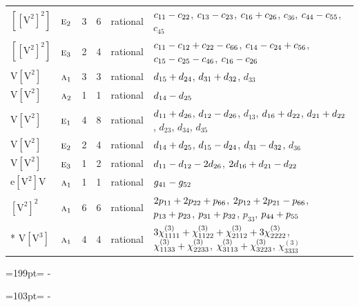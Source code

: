 \documentclass[10pt,a4paper]{article}
\newcommand{\needspace}[1]{\par\penalty-100\begingroup\dimen0=#1\relax\dimen2=\pagegoal
  \advance\dimen2-\pagetotal\ifdim\dimen0>\dimen2\relax\ifdim\dimen2>0pt\vfil\break\fi\fi
  \endgroup}
\numberwithin{equation}{section}
\newcommand{\irr}[1]{\text{\normalfont\scshape #1}}
\newcommand{\jahn}[1]{\mathrm{#1}}
\newlength{\fillwidth}\newlength{\cellwidth}\newlength{\colwidth}
\newcommand{\signbreak}{\penalty100\relax}
\begin{document}
{\begin{longtable}{@{}llrrl>{\RaggedRight\arraybackslash}p{\fillwidth}@{}}
$\jahn{[[V^{2}]^{2}]}$ & $\irr{e}_{2}$ & 3 & 6 & rational & $c_{11} -\signbreak c_{22}$, $c_{13} -\signbreak c_{23}$, $c_{16} +\signbreak c_{26}$, $c_{36}$, $c_{44} -\signbreak c_{55}$, $c_{45}$\\
$\jahn{[[V^{2}]^{2}]}$ & $\irr{e}_{3}$ & 2 & 4 & rational & $c_{11} -\signbreak c_{12} +\signbreak c_{22} -\signbreak c_{66}$, $c_{14} -\signbreak c_{24} +\signbreak c_{56}$, $c_{15} -\signbreak c_{25} -\signbreak c_{46}$, $c_{16} -\signbreak c_{26}$\\
$\jahn{V[V^{2}]}$ & $\irr{a}_{1}$ & 3 & 3 & rational & $d_{15} +\signbreak d_{24}$, $d_{31} +\signbreak d_{32}$, $d_{33}$\\
$\jahn{V[V^{2}]}$ & $\irr{a}_{2}$ & 1 & 1 & rational & $d_{14} -\signbreak d_{25}$\\
$\jahn{V[V^{2}]}$ & $\irr{e}_{1}$ & 4 & 8 & rational & $d_{11} +\signbreak d_{26}$, $d_{12} -\signbreak d_{26}$, $d_{13}$, $d_{16} +\signbreak d_{22}$, $d_{21} +\signbreak d_{22}$, $d_{23}$, $d_{34}$, $d_{35}$\\
$\jahn{V[V^{2}]}$ & $\irr{e}_{2}$ & 2 & 4 & rational & $d_{14} +\signbreak d_{25}$, $d_{15} -\signbreak d_{24}$, $d_{31} -\signbreak d_{32}$, $d_{36}$\\
$\jahn{V[V^{2}]}$ & $\irr{e}_{3}$ & 1 & 2 & rational & $d_{11} -\signbreak d_{12} -\signbreak 2d_{26}$, $2d_{16} +\signbreak d_{21} -\signbreak d_{22}$\\
$\jahn{e[V^{2}]V}$ & $\irr{a}_{1}$ & 1 & 1 & rational & $\mathnormal{g}_{41} -\signbreak \mathnormal{g}_{52}$\\
$\jahn{[V^{2}]^{2}}$ & $\irr{a}_{1}$ & 6 & 6 & rational & $2p_{11} +\signbreak 2p_{22} +\signbreak p_{66}$, $2p_{12} +\signbreak 2p_{21} -\signbreak p_{66}$, $p_{13} +\signbreak p_{23}$, $p_{31} +\signbreak p_{32}$, $p_{33}$, $p_{44} +\signbreak p_{55}$\\*
$\jahn{V[V^{3}]}$ & $\irr{a}_{1}$ & 4 & 4 & rational & $3\chi^{(3)}_{1111} +\signbreak \chi^{(3)}_{1122} +\signbreak \chi^{(3)}_{2112} +\signbreak 3\chi^{(3)}_{2222}$, $\chi^{(3)}_{1133} +\signbreak \chi^{(3)}_{2233}$, $\chi^{(3)}_{3113} +\signbreak \chi^{(3)}_{3223}$, $\chi^{(3)}_{3333}$\\
\bottomrule\end{longtable}}
\needspace{199pt}
\needspace{103pt}
\end{document}
